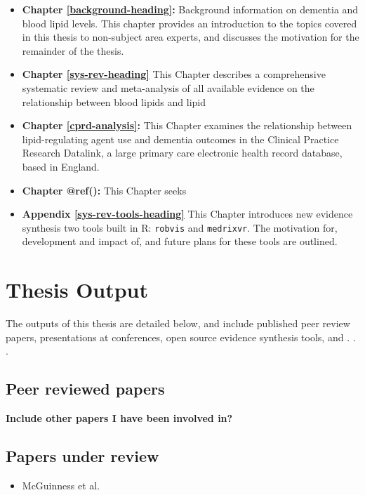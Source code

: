 \documentclass[a4paper, twoside]{templates/ociamthesis}
\providecommand{\tightlist}{%
  \setlength{\itemsep}{0pt}\setlength{\parskip}{0pt}}
\begin{document}
\begin{itemize}
\item
  \textbf{Chapter \ref{background-heading}:} Background information on dementia and blood lipid levels. This chapter provides an introduction to the topics covered in this thesis to non-subject area experts, and discusses the motivation for the remainder of the thesis.
\item
  \textbf{Chapter \ref{sys-rev-heading}} This Chapter describes a comprehensive systematic review and meta-analysis of all available evidence on the relationship between blood lipids and lipid
\item
  \textbf{Chapter \ref{cprd-analysis}:} This Chapter examines the relationship between lipid-regulating agent use and dementia outcomes in the Clinical Practice Research Datalink, a large primary care electronic health record database, based in England.
\item
  \textbf{Chapter @ref():} This Chapter seeks
\item
  \textbf{Appendix \ref{sys-rev-tools-heading}} This Chapter introduces new evidence synthesis two tools built in R: \texttt{robvis} and \texttt{medrixvr}. The motivation for, development and impact of, and future plans for these tools are outlined.
\end{itemize}

\hypertarget{thesis-output}{%
\section{Thesis Output}\label{thesis-output}}

The outputs of this thesis are detailed below, and include published peer review papers, presentations at conferences, open source evidence synthesis tools, and . . .

\hypertarget{peer-reviewed-papers}{%
\subsection{Peer reviewed papers}\label{peer-reviewed-papers}}

\textbf{Include other papers I have been involved in?}

\hypertarget{papers-under-review}{%
\subsection{Papers under review}\label{papers-under-review}}

\begin{itemize}
\tightlist
\item
  McGuinness et al.~
\end{itemize}
\end{document}
